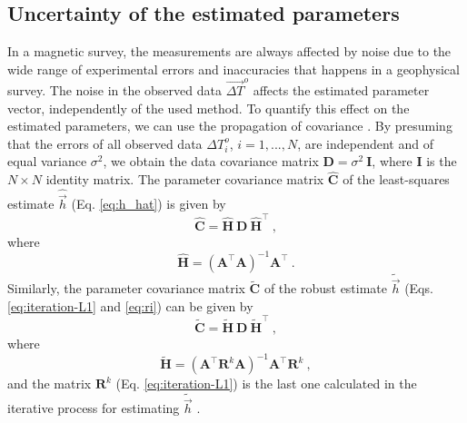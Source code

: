 \documentclass[journal abbreviation, npg]{copernicus}
\begin{document}
\subsection{Uncertainty of the estimated parameters}

In a magnetic survey, the measurements are always affected by noise due to the wide range of experimental errors and inaccuracies that happens in a geophysical survey. The noise in the observed data $\vec{\Delta T}^{o}$ affects the estimated parameter vector, independently of the used method. To quantify this effect on the estimated parameters, we can use the propagation of covariance \citep{bard1973, aster-etal2005}. By presuming that the errors of all observed data ${\Delta T}^{o}_{i}$, $i = 1, ..., N$, are independent and of equal variance $\sigma^{2}$, we obtain the data covariance matrix $\mathbf{D} = \sigma^{2} \: \mathbf{I}$, where $\mathbf{I}$ is the $N \times N$ identity matrix. The parameter covariance matrix $\hat{\mathbf{C}}$ of the least-squares estimate $\hat{\vec{h}}$ (Eq. \ref{eq:h_hat}) is given by
\begin{equation}
\hat{\mathbf{C}} = \hat{\mathbf{H}} \: \mathbf{D} \: \hat{\mathbf{H}}^{\intercal} \: ,
\label{eq:cov-h-hat}
\end{equation}
where
\begin{equation}
\hat{\mathbf{H}} = \left( \mathbf{A}^{\intercal}\mathbf{A} \right)^{-1} \mathbf{A}^{\intercal} \: .
\label{eq:H-h-hat}
\end{equation}
Similarly, the parameter covariance matrix $\tilde{\mathbf{C}}$ of the robust estimate $\tilde{\vec{h}}$ (Eqs. \ref{eq:iteration-L1} and \ref{eq:ri}) can be given by
\begin{equation}
\tilde{\mathbf{C}} = \tilde{\mathbf{H}} \: \mathbf{D} \: 
\tilde{\mathbf{H}}^{\intercal} \: ,
\label{eq:cov-h-tilde}
\end{equation}
where
\begin{equation}
\tilde{\mathbf{H}} = \left( \mathbf{A}^{\intercal} \mathbf{R}^{k} \mathbf{A} \right)^{-1}
\mathbf{A}^{\intercal} \mathbf{R}^{k} \: ,
\label{eq:H-h-tilde}
\end{equation}
and the matrix $\mathbf{R}^{k}$ (Eq. \ref{eq:iteration-L1}) is the last one calculated in the iterative process for estimating $\tilde{\vec{h}}$ \citep{bard1973, aster-etal2005}.
\end{document}
